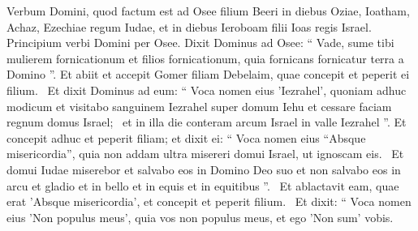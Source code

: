 \begin{biblechapter}
 \verse Verbum Domini, quod factum est ad Osee filium Beeri in diebus Oziae, Ioatham, Achaz, Ezechiae regum Iudae, et in diebus Ieroboam filii Ioas regis Israel.
 \verse Principium verbi Domini per Osee. Dixit Dominus ad Osee:
 “ Vade, sume tibi mulierem fornicationum
 et filios fornicationum,
 quia fornicans fornicatur terra a Domino ”.
 \verse Et abiit et accepit Gomer filiam Debelaim, quae concepit et peperit ei filium. 
 \verse Et dixit Dominus ad eum: “ Voca nomen eius 'Iezrahel', quoniam adhuc modicum et visitabo sanguinem Iezrahel super domum Iehu et cessare faciam regnum domus Israel; 
 \verse et in illa die conteram arcum Israel in valle Iezrahel ”.
 \verse Et concepit adhuc et peperit filiam; et dixit ei: “ Voca nomen eius “Absque misericordia”, quia non addam ultra misereri domui Israel, ut ignoscam eis. 
 \verse Et domui Iudae miserebor et salvabo eos in Domino Deo suo et non salvabo eos in arcu et gladio et in bello et in equis et in equitibus ”. 
 \verse Et ablactavit eam, quae erat 'Absque misericordia', et concepit et peperit filium. 
 \verse Et dixit: “ Voca nomen eius 'Non populus meus', quia vos non populus meus, et ego 'Non sum' vobis.
 

\end{biblechapter}
